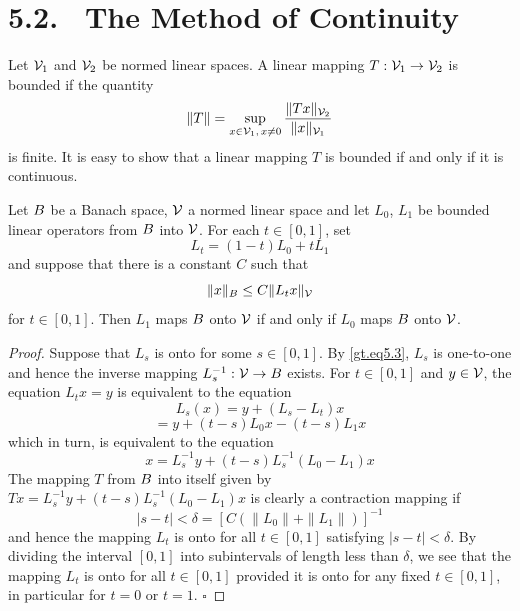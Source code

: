 \section*{5.2. \ The Method of Continuity}

\begin{definition}\label{gt.def5.2.bounded-linear-operator}
Let $\V_1$ and $\V_2$ be normed linear spaces. A linear mapping $T:\V_1 \to \V_2$ is bounded if the quantity
\begin{equation}\label{gt.eq5.2}\dcref{(5.2)}\group{chapter-5}\source{gilbarg-trudinger:page-0087}
\|T\| = \sup_{x \in \V_1,\, x \neq 0} \frac{\|Tx\|_{\V_2}}{\|x\|_{\V_1}}
\end{equation}
is finite. It is easy to show that a linear mapping $T$ is bounded if and only if it is continuous.
\end{definition}

\begin{theorem}\label{gt.thm5.2}
Let $\B$ be a Banach space, $\V$ a normed linear space and let $L_0$, $L_1$ be bounded linear operators from $\B$ into $\V$. For each $t \in [0,1]$, set
\[
L_t = (1-t)L_0 + tL_1
\]
and suppose that there is a constant $C$ such that
\begin{equation}\label{gt.eq5.3}\dcref{(5.3)}\group{chapter-5}\source{gilbarg-trudinger:page-0087}
\|x\|_{\B} \leq C\|L_t x\|_{\V}
\end{equation}
for $t \in [0,1]$. Then $L_1$ maps $\B$ onto $\V$ if and only if $L_0$ maps $\B$ onto $\V$.
\end{theorem}

\begin{proof}
Suppose that $L_s$ is onto for some $s \in [0,1]$. By \eqref{gt.eq5.3}, $L_s$ is one-to-one and hence the inverse mapping $L_s^{-1} : \V \to \B$ exists. For $t \in [0,1]$ and $y \in \V$, the equation $L_t x = y$ is equivalent to the equation
\[
L_s(x) = y + (L_s - L_t)x
\]
\[
= y + (t-s)L_0x - (t-s)L_1x
\]
which in turn, is equivalent to the equation
\[
x = L_s^{-1}y + (t-s)L_s^{-1}(L_0 - L_1)x
\]
The mapping $T$ from $\B$ into itself given by $Tx = L_s^{-1}y + (t-s)L_s^{-1}(L_0 - L_1)x$ is clearly a contraction mapping if
\[
|s-t| < \delta = [C(\|L_0\| + \|L_1\|)]^{-1}
\]
and hence the mapping $L_t$ is onto for all $t \in [0,1]$ satisfying $|s-t| < \delta$. By dividing the interval $[0,1]$ into subintervals of length less than $\delta$, we see that the mapping $L_t$ is onto for all $t \in [0,1]$ provided it is onto for any fixed $t \in [0,1]$, in particular for $t=0$ or $t=1$. $\square$
\end{proof}

